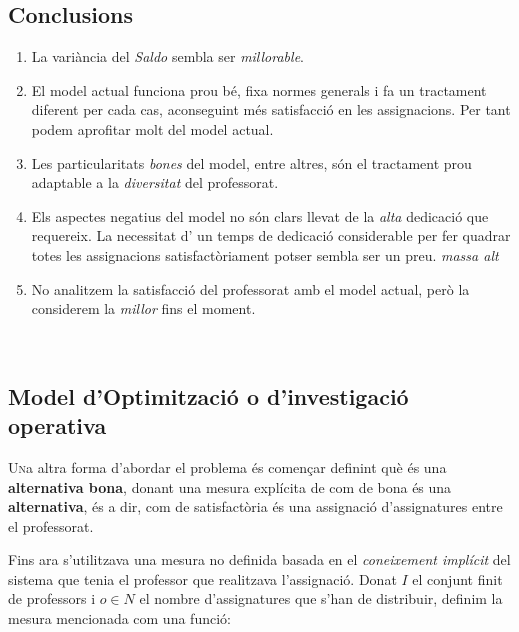 \documentclass[10pt,twocolumn]{article}
\newcommand{\esp}{\text{ }}
\begin{document}
\subsection{Conclusions}
		\begin{enumerate}
		    \item La variància del \textit{Saldo} sembla ser \textit{millorable}.
			\item El model actual funciona prou bé, fixa normes generals i fa un tractament diferent per cada cas, aconseguint més satisfacció en les assignacions. Per tant podem aprofitar molt del model actual. 
			\item Les particularitats \textit{bones} del model, entre altres, són el tractament prou adaptable a la \textit{diversitat} del professorat.
			\item Els aspectes negatius del model no són clars llevat de la \textit{alta} dedicació que requereix. La necessitat d' un temps de dedicació considerable per fer quadrar totes les assignacions satisfactòriament potser sembla ser un preu. \textit{massa alt}
			\item No analitzem la satisfacció del professorat amb el model actual, però la considerem la \textit{millor} fins el moment. 
		\end{enumerate}
\newpage
$\esp$
\newpage
\begin{tcolorbox}[colframe=white,colback=redviolet!20,sharp corners=all,size=minimal,halign=center,valign=center]
\section{Model d'Optimització o d'investigació operativa}
\end{tcolorbox}
\lettrine{U}na altra forma d'abordar el problema és començar definint què és una \textbf{alternativa bona}, donant una mesura explícita de com de bona és una \textbf{alternativa}, és a dir, com de satisfactòria és una assignació d'assignatures entre el professorat.

Fins ara s'utilitzava una mesura no definida basada en el \textit{coneixement implícit} del sistema que tenia el professor que realitzava l'assignació. Donat $I$ el conjunt finit de professors i $o \in N$ el nombre d'assignatures que s'han de distribuir, definim la mesura mencionada com una funció:
\end{document}
